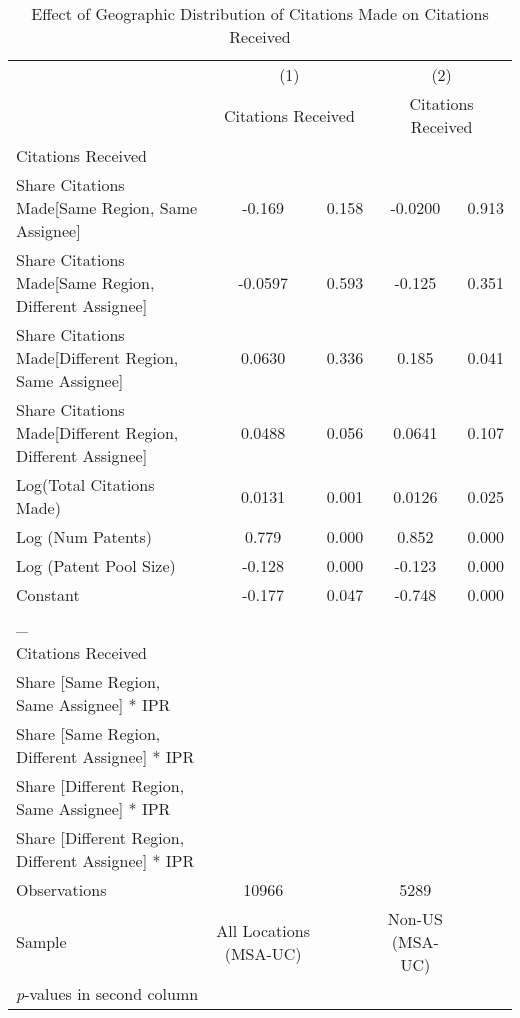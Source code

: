 {
\begin{longtable}{l*{2}{cc}}
\caption{Effect of Geographic Distribution of Citations Made on Citations Received \label{model12}}\\
\hline\hline\endfirsthead\hline\endhead\hline\endfoot\endlastfoot
                &\multicolumn{2}{c}{(1)}&\multicolumn{2}{c}{(2)}\\
                &\multicolumn{2}{c}{Citations Received}&\multicolumn{2}{c}{Citations Received}\\
\hline
Citations Received&         &         &         &         \\
Share Citations Made[Same Region, Same Assignee]&   -0.169&    0.158&  -0.0200&    0.913\\
Share Citations Made[Same Region, Different Assignee]&  -0.0597&    0.593&   -0.125&    0.351\\
Share Citations Made[Different Region, Same Assignee]&   0.0630&    0.336&    0.185&    0.041\\
Share Citations Made[Different Region, Different Assignee]&   0.0488&    0.056&   0.0641&    0.107\\
Log(Total Citations Made)&   0.0131&    0.001&   0.0126&    0.025\\
Log (Num Patents)&    0.779&    0.000&    0.852&    0.000\\
Log (Patent Pool Size)&   -0.128&    0.000&   -0.123&    0.000\\
Constant        &   -0.177&    0.047&   -0.748&    0.000\\
\hline
\_               &         &         &         &         \\
Citations Received&         &         &         &         \\
Share [Same Region, Same Assignee] * IPR&         &         &         &         \\
Share [Same Region, Different Assignee] * IPR&         &         &         &         \\
Share [Different Region, Same Assignee] * IPR&         &         &         &         \\
Share [Different Region, Different Assignee] * IPR&         &         &         &         \\
\hline
Observations    &    10966&         &     5289&         \\
Sample          &All Locations (MSA-UC)&         &Non-US (MSA-UC)&         \\
\hline\hline
\multicolumn{5}{l}{\footnotesize \textit{p}-values in second column}\\
\end{longtable}
}

